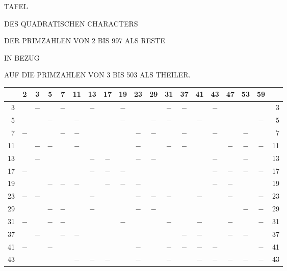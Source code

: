 \clearpage
{}%
\renewcommand{\BookRunningTitle}{Tafel des quadratischen Characters}
\begin{center}
{\Large TAFEL}\par\bigskip
DES QUADRATISCHEN CHARACTERS\par\bigskip
DER PRIMZAHLEN VON 2 BIS 997 ALS RESTE\par\bigskip
IN BEZUG\par\bigskip
AUF DIE PRIMZAHLEN VON 3 BIS 503 ALS THEILER.
\end{center}
\clearpage

%
\begin{center}\begingroup\fontsize{8}{10.5}\selectfont\setlength{\tabcolsep}{2pt}
\begin{tabular}{r|c|c|c|c|c|c|c|c|c|c|c|c|c|c|c|c|c|r}
\hline
 & 2 & 3 & 5 & 7 & 11 & 13 & 17 & 19 & 23 & 29 & 31 & 37 & 41 & 43 & 47 & 53 & 59 & \\
\hline
3 &  & $-$ &  & $-$ &  & $-$ &  & $-$ &  &  & $-$ & $-$ &  & $-$ &  &  &  & 3\\
5 &  &  & $-$ &  & $-$ &  &  & $-$ &  & $-$ & $-$ &  & $-$ &  &  &  & $-$ & 5\\
7 & $-$ &  &  & $-$ & $-$ &  &  &  & $-$ & $-$ &  & $-$ &  & $-$ &  & $-$ &  & 7\\
11 &  & $-$ & $-$ &  & $-$ &  &  &  & $-$ &  & $-$ & $-$ &  &  & $-$ & $-$ & $-$ & 11\\
13 &  & $-$ &  &  &  & $-$ & $-$ &  & $-$ & $-$ &  &  &  & $-$ &  & $-$ &  & 13\\
17 & $-$ &  &  &  &  & $-$ & $-$ & $-$ &  &  &  &  &  & $-$ & $-$ & $-$ & $-$ & 17\\
19 &  &  & $-$ & $-$ & $-$ &  & $-$ & $-$ & $-$ &  &  &  &  & $-$ & $-$ &  &  & 19\\
23 & $-$ & $-$ &  &  &  & $-$ &  &  & $-$ & $-$ & $-$ &  & $-$ &  & $-$ &  & $-$ & 23\\
29 &  &  & $-$ & $-$ &  & $-$ &  &  & $-$ & $-$ &  &  &  &  &  & $-$ & $-$ & 29\\
31 & $-$ &  & $-$ & $-$ &  &  &  & $-$ &  &  & $-$ &  & $-$ &  & $-$ &  & $-$ & 31\\
37 &  & $-$ &  & $-$ & $-$ &  &  &  &  &  &  & $-$ & $-$ &  & $-$ & $-$ &  & 37\\
41 & $-$ &  & $-$ &  &  &  &  &  & $-$ &  & $-$ & $-$ & $-$ & $-$ &  &  & $-$ & 41\\
43 &  &  &  &  & $-$ & $-$ & $-$ &  & $-$ &  & $-$ &  & $-$ & $-$ & $-$ & $-$ & $-$ & 43\\

\end{tabular}
\end{center}
